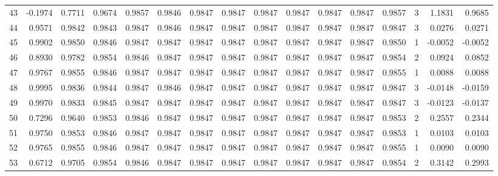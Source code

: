 \begin{tabular}{lrrrrrrrrrrrrrrr}
43  &     -0.1974 &  0.7711 &  0.9674 &  0.9857 &  0.9846 &  0.9847 &  0.9847 &  0.9847 &  0.9847 &  0.9847 &   0.9847 &     0.9857 &      3 &                    1.1831 &                     0.9685 \\
44  &      0.9571 &  0.9842 &  0.9843 &  0.9847 &  0.9846 &  0.9847 &  0.9847 &  0.9847 &  0.9847 &  0.9847 &   0.9847 &     0.9847 &      3 &                    0.0276 &                     0.0271 \\
45  &      0.9902 &  0.9850 &  0.9846 &  0.9847 &  0.9847 &  0.9847 &  0.9847 &  0.9847 &  0.9847 &  0.9847 &   0.9847 &     0.9850 &      1 &                   -0.0052 &                    -0.0052 \\
46  &      0.8930 &  0.9782 &  0.9854 &  0.9846 &  0.9847 &  0.9847 &  0.9847 &  0.9847 &  0.9847 &  0.9847 &   0.9847 &     0.9854 &      2 &                    0.0924 &                     0.0852 \\
47  &      0.9767 &  0.9855 &  0.9846 &  0.9847 &  0.9847 &  0.9847 &  0.9847 &  0.9847 &  0.9847 &  0.9847 &   0.9847 &     0.9855 &      1 &                    0.0088 &                     0.0088 \\
48  &      0.9995 &  0.9836 &  0.9844 &  0.9847 &  0.9846 &  0.9847 &  0.9847 &  0.9847 &  0.9847 &  0.9847 &   0.9847 &     0.9847 &      3 &                   -0.0148 &                    -0.0159 \\
49  &      0.9970 &  0.9833 &  0.9845 &  0.9847 &  0.9847 &  0.9847 &  0.9847 &  0.9847 &  0.9847 &  0.9847 &   0.9847 &     0.9847 &      3 &                   -0.0123 &                    -0.0137 \\
50  &      0.7296 &  0.9640 &  0.9853 &  0.9846 &  0.9847 &  0.9847 &  0.9847 &  0.9847 &  0.9847 &  0.9847 &   0.9847 &     0.9853 &      2 &                    0.2557 &                     0.2344 \\
51  &      0.9750 &  0.9853 &  0.9846 &  0.9847 &  0.9847 &  0.9847 &  0.9847 &  0.9847 &  0.9847 &  0.9847 &   0.9847 &     0.9853 &      1 &                    0.0103 &                     0.0103 \\
52  &      0.9765 &  0.9855 &  0.9846 &  0.9847 &  0.9847 &  0.9847 &  0.9847 &  0.9847 &  0.9847 &  0.9847 &   0.9847 &     0.9855 &      1 &                    0.0090 &                     0.0090 \\
53  &      0.6712 &  0.9705 &  0.9854 &  0.9846 &  0.9847 &  0.9847 &  0.9847 &  0.9847 &  0.9847 &  0.9847 &   0.9847 &     0.9854 &      2 &                    0.3142 &                     0.2993 \\

\end{tabular}
